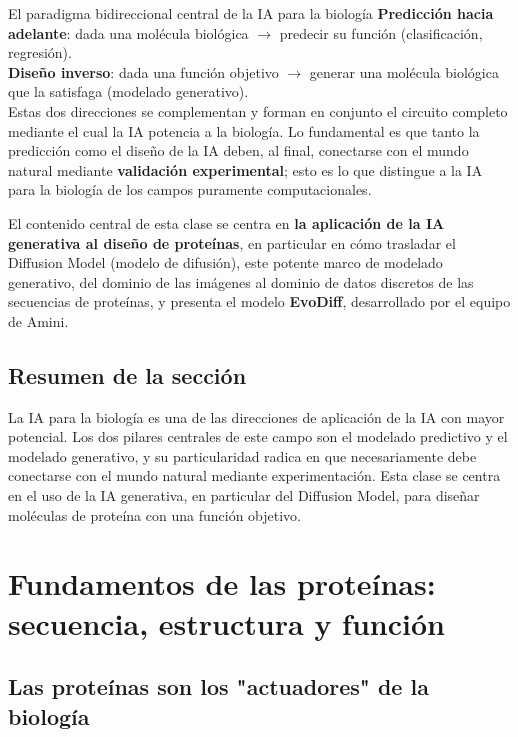 \documentclass[a4paper]{article}
\begin{document}
\begin{importantbox}{El paradigma bidireccional central de la IA para la biología}
\textbf{Predicción hacia adelante}: dada una molécula biológica $\rightarrow$ predecir su función (clasificación, regresión).\\
\textbf{Diseño inverso}: dada una función objetivo $\rightarrow$ generar una molécula biológica que la satisfaga (modelado generativo).\\
Estas dos direcciones se complementan y forman en conjunto el circuito completo mediante el cual la IA potencia a la biología. Lo fundamental es que tanto la predicción como el diseño de la IA deben, al final, conectarse con el mundo natural mediante \textbf{validación experimental}; esto es lo que distingue a la IA para la biología de los campos puramente computacionales.
\end{importantbox}

El contenido central de esta clase se centra en \textbf{la aplicación de la IA generativa al diseño de proteínas}, en particular en cómo trasladar el Diffusion Model (modelo de difusión), este potente marco de modelado generativo, del dominio de las imágenes al dominio de datos discretos de las secuencias de proteínas, y presenta el modelo \textbf{EvoDiff}, desarrollado por el equipo de Amini.

\subsection{Resumen de la sección}

La IA para la biología es una de las direcciones de aplicación de la IA con mayor potencial. Los dos pilares centrales de este campo son el modelado predictivo y el modelado generativo, y su particularidad radica en que necesariamente debe conectarse con el mundo natural mediante experimentación. Esta clase se centra en el uso de la IA generativa, en particular del Diffusion Model, para diseñar moléculas de proteína con una función objetivo.

\section{Fundamentos de las proteínas: secuencia, estructura y función}

\subsection{Las proteínas son los "actuadores" de la biología}
\end{document}
